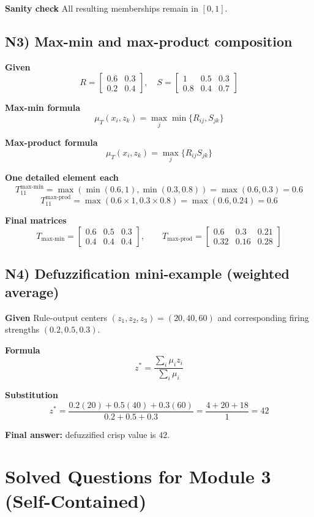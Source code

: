 \documentclass[11pt,a4paper]{article}
\begin{document}
\textbf{Sanity check}
All resulting memberships remain in $[0,1]$.

\subsection*{N3) Max-min and max-product composition}
\textbf{Given}
\[
R=\begin{bmatrix}0.6&0.3\\0.2&0.4\end{bmatrix},
\quad
S=\begin{bmatrix}1&0.5&0.3\\0.8&0.4&0.7\end{bmatrix}
\]

\textbf{Max-min formula}
\[
\mu_{T}(x_i,z_k)=\max_j\min\{R_{ij},S_{jk}\}
\]

\textbf{Max-product formula}
\[
\mu_{T}(x_i,z_k)=\max_j\{R_{ij}S_{jk}\}
\]

\textbf{One detailed element each}
\[
T_{11}^{\text{max-min}}=\max(\min(0.6,1),\min(0.3,0.8))=\max(0.6,0.3)=0.6
\]
\[
T_{11}^{\text{max-prod}}=\max(0.6\times1,0.3\times0.8)=\max(0.6,0.24)=0.6
\]

\textbf{Final matrices}
\[
T_{\text{max-min}}=\begin{bmatrix}0.6&0.5&0.3\\0.4&0.4&0.4\end{bmatrix},
\qquad
T_{\text{max-prod}}=\begin{bmatrix}0.6&0.3&0.21\\0.32&0.16&0.28\end{bmatrix}
\]

\subsection*{N4) Defuzzification mini-example (weighted average)}
\textbf{Given}
Rule-output centers $(z_1,z_2,z_3)=(20,40,60)$ and corresponding firing strengths $(0.2,0.5,0.3)$.

\textbf{Formula}
\[
z^*=\frac{\sum_i \mu_i z_i}{\sum_i\mu_i}
\]

\textbf{Substitution}
\[
z^*=\frac{0.2(20)+0.5(40)+0.3(60)}{0.2+0.5+0.3}=\frac{4+20+18}{1}=42
\]

\textbf{Final answer:} defuzzified crisp value is $42$.

\section*{Solved Questions for Module 3 (Self-Contained)}
\end{document}
